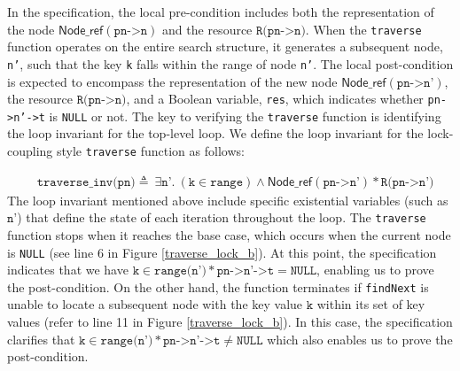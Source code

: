 \documentclass[a4paper,UKenglish,cleveref, autoref, thm-restate]{lipics-v2021}
\newcommand{\nodeboxrep}{\ensuremath{\mathsf{Node\_ref}}}
\begin{document}
In the specification, the local pre-condition includes both the representation of the node $\nodeboxrep(\texttt{pn->n})$ and the resource $\texttt{R(pn->n)}$. When the \texttt{traverse} function operates on the entire search structure, it generates a subsequent node, \texttt{n'}, such that the key \texttt{k} falls within the range of node \texttt{n'}. The local post-condition is expected to encompass the representation of the new node $\nodeboxrep(\texttt{pn->n'})$, the resource $\texttt{R(pn->n)}$, and a Boolean variable, \texttt{res}, which indicates whether \texttt{pn->n'->t} is \texttt{NULL} or not. The key to verifying the \texttt{traverse} function is identifying the loop invariant for the top-level loop. We define the loop invariant for the lock-coupling style \texttt{traverse} function as follows:

\begin{align*} &\texttt{traverse\_inv(pn)} \triangleq\ \exists \texttt{n'}.\ (\texttt{k} \in \texttt{range})\land \nodeboxrep(\texttt{pn->n'})  \ast  \texttt{R(pn->n')}   
\end{align*}
The loop invariant mentioned above include specific existential variables (such as $\texttt{n'}$) that define the state of each iteration throughout the loop. The \lstinline{traverse} function stops when it reaches the base case, which occurs when the current node is \lstinline{NULL} (see line 6 in Figure \ref{traverse_lock_b}). At this point, the specification indicates that we have $\texttt{k} \in \texttt{range(n')} \ast \texttt{pn->n'->t} = \texttt{NULL}$, enabling us to prove the post-condition. On the other hand, the function terminates if \lstinline{findNext} is unable to locate a subsequent node with the key value  $\texttt{k}$ within its set of key values (refer to line 11 in Figure \ref{traverse_lock_b}). In this case, the specification clarifies that $\texttt{k} \in \texttt{range(n')} \ast \texttt{pn->n'->t} \neq \texttt{NULL}$ which also enables us to prove the post-condition. 

\end{document}
